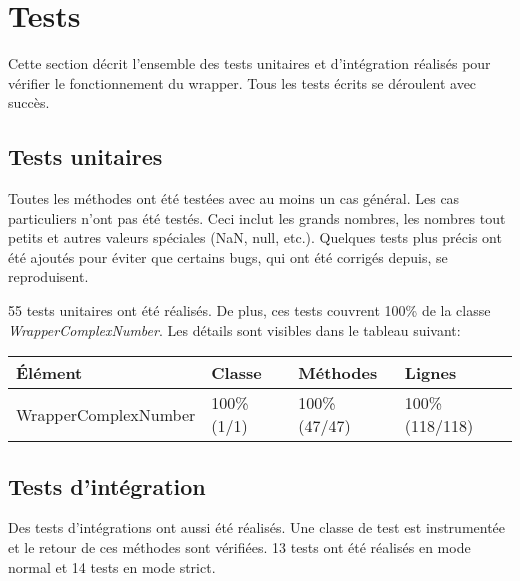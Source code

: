 \section{Tests}

Cette section décrit l'ensemble des tests unitaires et d'intégration réalisés pour vérifier le fonctionnement du wrapper. Tous les tests écrits se déroulent avec succès.

\subsection{Tests unitaires}

Toutes les méthodes ont été testées avec au moins un cas général. Les cas particuliers n'ont pas été testés. Ceci inclut les grands nombres, les nombres tout petits et autres valeurs spéciales (NaN, null, etc.). Quelques tests plus précis ont été ajoutés pour éviter que certains bugs, qui ont été corrigés depuis, se reproduisent.

55 tests unitaires ont été réalisés. De plus, ces tests couvrent 100\% de la classe \textit{WrapperComplexNumber}. Les détails sont visibles dans le tableau suivant:

\begin{table}[h]
    \begin{tabularx}{\columnwidth}{ | p{12em} | X | X | X |}
        \hline
        \textbf{Élément} & \textbf{Classe} & \textbf{Méthodes} & \textbf{Lignes} \\
        \hline
        WrapperComplexNumber & 100\% (1/1) & 100\% (47/47) & 100\% (118/118) \\
        \hline
    \end{tabularx}
\end{table}

\subsection{Tests d'intégration}

Des tests d'intégrations ont aussi été réalisés. Une classe de test est instrumentée et le retour de ces méthodes sont vérifiées. 13 tests ont été réalisés en mode normal et 14 tests en mode strict.
